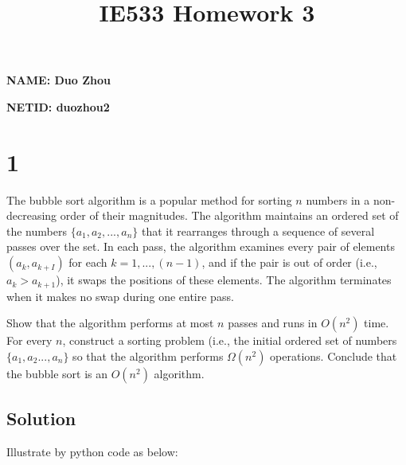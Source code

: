 \documentclass[11pt]{article}
\title{IE533 Homework 3}
\begin{document}
    
    \maketitle
    
    

    
    \textbf{NAME: Duo Zhou}

\textbf{NETID: duozhou2}

    \hypertarget{section}{%
\section{1}\label{section}}

The bubble sort algorithm is a popular method for sorting \(n\) numbers
in a non-decreasing order of their magnitudes. The algorithm maintains
an ordered set of the numbers \(\{a_1, a_2, ... , a_n\}\) that it
rearranges through a sequence of several passes over the set. In each
pass, the algorithm examines every pair of elements \((a_k, a_{k+I})\)
for each \(k = 1,...,(n-1)\), and if the pair is out of order (i.e.,
\(a_k > a_{k+1}\)), it swaps the positions of these elements. The
algorithm terminates when it makes no swap during one entire pass.

Show that the algorithm performs at most \(n\) passes and runs in
\(O(n^2)\) time. For every \(n\), construct a sorting problem (i.e., the
initial ordered set of numbers \(\{a_1, a_2...,a_n\}\) so that the
algorithm performs \(\Omega(n^2)\) operations. Conclude that the bubble
sort is an \(O(n^2)\) algorithm.

\hypertarget{solution}{%
\subsection{Solution}\label{solution}}

Illustrate by python code as below:
\end{document}

